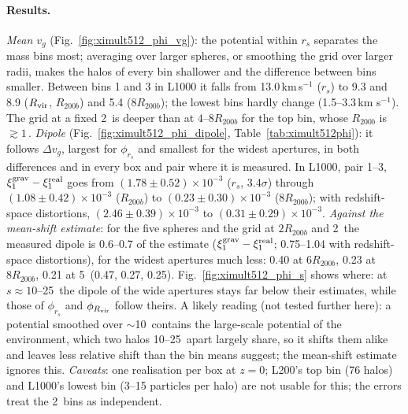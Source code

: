 \paragraph{Results.} \emph{Mean $v_g$} (Fig.~\ref{fig:ximult512_phi_vg}): the potential within $r_s$ separates the
mass bins most; averaging over larger spheres, or smoothing the grid over larger radii, makes the halos of every bin
shallower and the difference between bins smaller. Between bins 1 and 3 in L1000 it falls from 13.0\,km\,s$^{-1}$
($r_s$) to 9.3 and 8.9 ($R_{\rm vir}$, $R_{200b}$) and 5.4 ($8R_{200b}$); the lowest bins hardly change (1.5--3.3\,km
s$^{-1}$). The grid at a fixed 2\,\Mpch{} is deeper than at $4$--$8R_{200b}$ for the top bin, whose $R_{200b}$ is
$\gtrsim1$\,\Mpch. \emph{Dipole} (Fig.~\ref{fig:ximult512_phi_dipole}, Table~\ref{tab:ximult512phi}): it follows
$\Delta v_g$, largest for $\phi_{r_s}$ and smallest for the widest apertures, in both differences and in every box
and pair where it is measured. In L1000, pair 1--3, $\xi_1^{\rm grav}-\xi_1^{\rm real}$ goes from
$(1.78\pm0.52)\times10^{-3}$ ($r_s$, 3.4$\sigma$) through $(1.08\pm0.42)\times10^{-3}$ ($R_{200b}$) to
$(0.23\pm0.30)\times10^{-3}$ ($8R_{200b}$); with redshift-space distortions, $(2.46\pm0.39)\times10^{-3}$ to
$(0.31\pm0.29)\times10^{-3}$. \emph{Against the mean-shift estimate}: for the five spheres and the grid at $2R_{200b}$
and 2\,\Mpch{} the measured dipole is 0.6--0.7 of the estimate ($\xi_1^{\rm grav}-\xi_1^{\rm real}$; 0.75--1.04 with
redshift-space distortions), for the widest apertures much less: 0.40 at $6R_{200b}$, 0.23 at $8R_{200b}$, 0.21 at
5\,\Mpch{} (0.47, 0.27, 0.25). Fig.~\ref{fig:ximult512_phi_s} shows where: at $s\approx10$--25\,\Mpch{} the dipole of
the wide apertures stays far below their estimates, while those of $\phi_{r_s}$ and $\phi_{R_{\rm vir}}$ follow theirs.
A likely reading (not tested further here): a potential smoothed over $\sim$10\,\Mpch{} contains the large-scale
potential of the environment, which two halos 10--25\,\Mpch{} apart largely share, so it shifts them alike and leaves
less relative shift than the bin means suggest; the mean-shift estimate ignores this. \emph{Caveats}: one realisation
per box at $z=0$; L200's top bin (76 halos) and L1000's lowest bin (3--15 particles per halo) are not usable for this;
the errors treat the 2\,\Mpch{} bins as independent.

